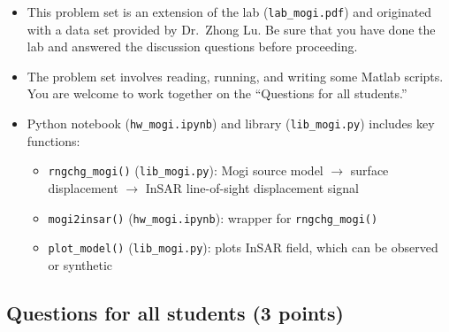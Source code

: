 \documentclass[11pt,titlepage,fleqn]{article}
\newcommand{\tfile}{{\tt hw\_mogi.ipynb}}
\newcommand{\lfile}{{\tt lib\_mogi.py}}
\begin{document}
\begin{itemize}
\item This problem set is an extension of the lab (\verb+lab_mogi.pdf+) and originated with a data set provided by Dr.~Zhong Lu. Be sure that you have done the lab and answered the discussion questions before proceeding.

\item The problem set involves reading, running, and writing some Matlab scripts. You are welcome to work together on the ``Questions for all students.''

\item Python notebook (\tfile) and library (\lfile) includes key functions:
\begin{itemize}

\item \verb+rngchg_mogi()+ (\lfile): Mogi source model $\rightarrow$ surface displacement $\rightarrow$ InSAR line-of-sight displacement signal

\item \verb+mogi2insar()+ (\tfile): wrapper for \verb+rngchg_mogi()+ 

\item \verb+plot_model()+ (\lfile): plots InSAR field, which can be observed or synthetic

\end{itemize}

\end{itemize}


\subsection*{Questions for all students (3 points)}
\end{document}
